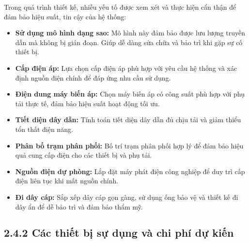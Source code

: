 Trong quá trình thiết kế, nhiều yếu tố được xem xét và thực hiện cẩn thận để đảm bảo hiệu suất, tin cậy của hệ thống:
\begin{itemize}
    \item \textbf{Sử dụng mô hình dạng sao:} Mô hình này đảm bảo được lưu lượng truyền dẫn mà không bị gián đoạn. Giúp dễ dàng sửa chữa và bảo trì khi gặp sự cố thiết bị.
    \item \textbf{Cấp điện áp:} Lựa chọn cấp điện áp phù hợp với yêu cầu hệ thống và xác định nguồn điện chính để đáp ứng nhu cầu sử dụng.
    \item \textbf{Điện dung máy biến áp:} Chọn máy biến áp có công suất phù hợp với phụ tải thực tế, đảm bảo hiệu suất hoạt động tối ưu.
    \item \textbf{Tiết diện dây dẫn:} Tính toán tiết diện dây dẫn đủ chịu tải và giảm thiểu tổn thất điện năng.
    \item \textbf{Phân bố trạm phân phối:} Bố trí trạm phân phối hợp lý để đảm bảo hiệu quả cung cấp điện cho các thiết bị và phụ tải.
    \item \textbf{Nguồn điện dự phòng:} Lắp đặt máy phát điện công nghiệp để duy trì cấp điện liên tục khi mất nguồn chính.
    \item \textbf{Đi dây cáp:} Sắp xếp dây cáp gọn gàng, sử dụng ống bảo vệ và thiết kế đi dây ẩn để dễ bảo trì và đảm bảo thẩm mỹ.
\end{itemize}
\subsection*{2.4.2 Các thiết bị sự dụng và chi phí dự kiến}


